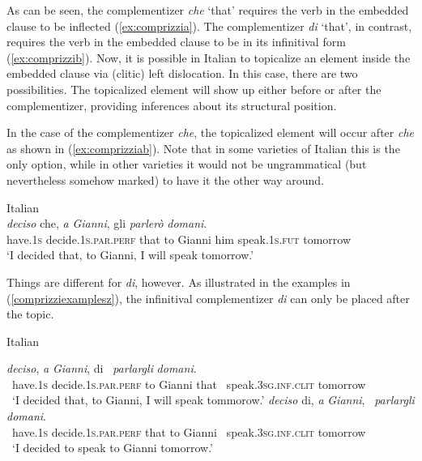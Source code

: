 \noindent As can be seen, the complementizer \textit{che} `that' requires the verb in the embedded clause to be inflected (\ref{ex:comprizzia}). The complementizer \textit{di} `that', in contrast, requires the verb in the embedded clause to be in its infinitival form (\ref{ex:comprizzib}). Now, it is possible in Italian to topicalize an element inside the embedded clause via (clitic) left dislocation. In this case, there are two possibilities. The topicalized element will show up either before or after the complementizer, providing inferences about its structural position. 

In the case of the complementizer \textit{che}, the topicalized element will occur after \textit{che} as shown in (\ref{ex:comprizziab}). Note that in some varieties of Italian this is the only option, while in other varieties it would not be ungrammatical (but nevertheless somehow marked) to have it the other way around. 

\begin{exe}
\ex Italian \citep[205]{rizzi2013notes} \\  {\textit{deciso}} {che,} {\textit{a}} {\textit{Gianni},} {gli} {\textit{parlerò}}  {\textit{domani}.} \\
{have.\textsc{1s}} {decide.\textsc{1s.par.perf}} {that} {to} {Gianni} {him} {speak.\textsc{1s.fut}}  {tomorrow} \\
\trans `I decided that, to Gianni, I will speak tomorrow.' \label{ex:comprizziab}
\end{exe}

\noindent Things are different for \textit{di}, however. As illustrated in the examples in (\ref{comprizziexamplesz}), the infinitival complementizer \textit{di} can only be placed after the topic. 

\begin{exe}
\ex Italian \citep[205]{rizzi2013notes} \label{comprizziexamplesz}\begin{xlist} 
\ex {} {\textit{deciso},} {\textit{a}} {\textit{Gianni},} {di} {\textcolor{white}{*}\textit{parlargli}} {\textit{domani}.} \\
{\textcolor{white}{*}have.\textsc{1s}} {decide.\textsc{1s.par.perf}} {to} {Gianni} {that} {\textcolor{white}{*}speak.\textsc{3sg.inf}.\textsc{clit}} {tomorrow} \\
\trans \textcolor{white}{*}`I decided that, to Gianni, I will speak tommorow.' \label{ex:comprizziabz}
\ex {} {\textit{deciso}} {di,} {\textit{a}} {\textit{Gianni},} {\textcolor{white}{*}\textit{parlargli}} {\textit{domani}.} \\
{\textcolor{white}{*}have.\textsc{1s}} {decide.\textsc{1s.par.perf}} {that} {to} {Gianni} {\textcolor{white}{*}speak.\textsc{3sg.inf}.\textsc{clit}} {tomorrow} \\
\trans \textcolor{white}{*}`I decided to speak to Gianni tomorrow.' \label{ex:comprizziaz}
\end{xlist}
\end{exe}

